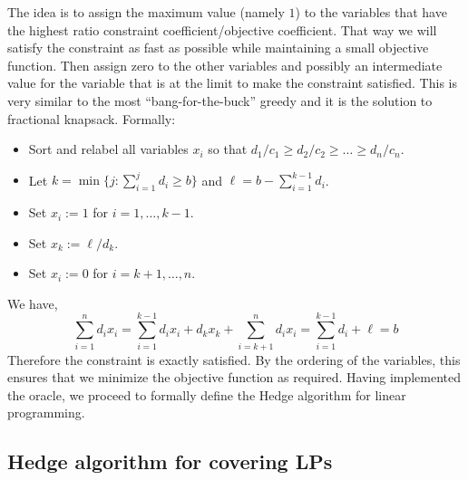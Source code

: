 The idea is to assign the maximum value (namely $1$) to the variables that have the highest ratio
constraint coefficient/objective coefficient. That way we will satisfy the constraint as fast as
possible while maintaining a small objective function. Then assign zero to the other variables and
possibly an intermediate value for the variable that is at the limit to make the constraint
satisfied. This is very similar to the most ``bang-for-the-buck'' greedy and it is the solution to
fractional knapsack. Formally:
\begin{itemize}
  \item Sort and relabel all variables $x_i$ so that $d_1/c_1\ge d_2/c_2\ge\ldots\ge d_n/c_n$.
  \item Let $k=\min\{j:\sum_{i=1}^j d_i\ge b\}$ and $\ell=b-\sum_{i=1}^{k-1}d_i$.
  \item Set $x_i:=1$ for $i=1,\ldots,k-1$.
  \item Set $x_k:=\ell/d_k$.
  \item Set $x_i:=0$ for $i=k+1,\ldots,n$.
\end{itemize}
We have,
\[
  \sum_{i=1}^n d_i x_i=\sum_{i=1}^{k-1}d_i x_i+d_k x_k+\sum_{i=k+1}^n d_i x_i=\sum_{i=1}^{k-1}d_i+\ell=b
\]
Therefore the constraint is exactly satisfied. By the ordering of the variables, this ensures that
we minimize the objective function as required. Having implemented the oracle, we proceed to
formally define the Hedge algorithm for linear programming.

\subsection{Hedge algorithm for covering LPs}

